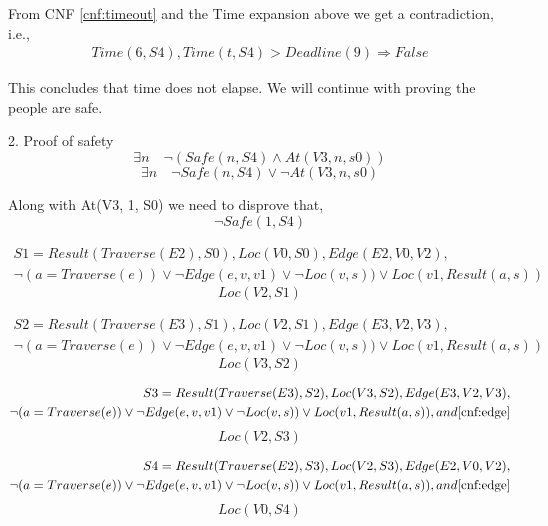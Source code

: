 \documentclass{article}                     %
\begin{document}
	From CNF \ref{cnf:timeout} and the Time expansion above we get a contradiction, i.e.,
	\begin{equation}\label{key}
	\begin{split}
		Time(6, S4), Time(t, S4) > Deadline(9) \Rightarrow False
	\end{split}
	\end{equation}
	
	This concludes that time does not elapse. We will continue with proving the people are safe.
	
	2. Proof of safety
	$$ \exists n \quad \neg(Safe(n, S4)\land At(V3, n, s0)) $$
	$$ \exists n \quad \neg Safe(n, S4)\lor \neg At(V3, n, s0) $$
	
	Along with At(V3, 1, S0) we need to disprove that,
	$$ \neg Safe(1, S4) $$
	
	\begin{equation}\label{key}
	\begin{split}
	S1 = Result(Traverse(E2), S0), Loc(V0, S0), Edge(E2, V0, V2),  \\\neg (a=Traverse(e)) \lor \neg Edge(e, v, v1) \lor \neg Loc(v, s)) \lor Loc(v1, Result(a, s))
	\end{split}
	\end{equation}
	$$ Loc(V2, S1) $$
	
	\begin{equation}\label{key}
	\begin{split}
	S2 = Result(Traverse(E3), S1), Loc(V2, S1), Edge(E3, V2, V3),  \\\neg (a=Traverse(e)) \lor \neg Edge(e, v, v1) \lor \neg Loc(v, s)) \lor Loc(v1, Result(a, s))
	\end{split}
	\end{equation}
	$$ Loc(V3, S2) $$
	
	\begin{equation}\label{key}
	\begin{split}
	S3 = Result(Traverse(E3), S2), Loc(V3, S2), Edge(E3, V2, V3),  \\\neg (a=Traverse(e)) \lor \neg Edge(e, v, v1) \lor \neg Loc(v, s)) \lor Loc(v1, Result(a, s)), and \eqref{cnf:edge}
	\end{split}
	\end{equation}
	$$ Loc(V2, S3) $$
	
	\begin{equation}\label{key}
	\begin{split}
	S4 = Result(Traverse(E2), S3), Loc(V2, S3), Edge(E2, V0, V2), \\ \neg (a=Traverse(e)) \lor \neg Edge(e, v, v1) \lor \neg Loc(v, s)) \lor Loc(v1, Result(a, s)), and \eqref{cnf:edge}
	\end{split}
	\end{equation}
	$$ Loc(V0, S4) $$
	
\end{document}
